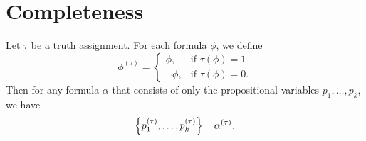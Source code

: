 \section{Completeness}
\begin{lemma}
  \label{thm:completeness-lemma}
  Let $\tau$ be a truth assignment.
  For each formula $\phi$, we define
  \begin{equation*}
    \phi^{(\tau)} =
    \begin{cases}
      \phi, & \text{if $\tau(\phi) = 1$} \\
      \neg \phi, & \text{if $\tau(\phi) = 0$}.
    \end{cases}
  \end{equation*}
  Then for any formula $\alpha$ that consists of only the propositional
  variables $p_1, \dots, p_k$, we have
  \begin{equation*}
    \Bigl\{p_1^{(\tau)}, \dots, p_k^{(\tau)}\Bigr\} \vdash \alpha^{(\tau)}.
  \end{equation*}
\end{lemma}
